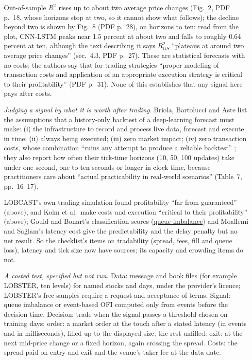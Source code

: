 \begin{qfdefinition}
Out-of-sample $R^2$ rises up to about two average price changes (Fig.~2, PDF p.~18, whose horizons stop at two, so it cannot show what follows); the decline beyond two is shown by Fig.~8 (PDF p.~28), on horizons to ten: read from the plot, CNN-LSTM peaks near 1.5 percent at about two and falls to roughly 0.64 percent at ten, although the text describing it says $R^2_{OS}$ ``plateaus at around two average price changes'' (sec.~4.3, PDF p.~27). These are statistical forecasts with no costs; the authors say that for trading strategies ``proper modeling of transaction costs and application of an appropriate execution strategy is critical to their profitability'' (PDF p.~31). None of this establishes that any signal here pays after costs.

\emph{Judging a signal by what it is worth after trading}. Briola, Bartolucci and Aste list the assumptions that a history-only backtest of a deep-learning forecast must make: (i) the infrastructure to record and process live data, forecast and execute in time; (ii) always being executed; (iii) zero market impact; (iv) zero transaction costs, whose combination ``ruins any attempt to produce a reliable backtest'' \citep[arXiv v4, sec.~7, pp.~22--23]{w2-briola-lob-guide}; they also report how often their tick-time horizons (10, 50, 100 updates) take under one second, one to ten seconds or longer in clock time, because practitioners care about ``actual practicability in real-world scenarios'' (Table~7, pp.~16--17).

LOBCAST's own trading simulation found profitability ``far from guaranteed'' (above), and Kolm et al.\ make costs and execution ``critical to their profitability'' (above); Gould and Bonart's classification scores (\hyperref[def:queue-imbalance]{queue imbalance}) and Moallemi and Sağlam's latency cost give the predictability and the delay penalty but no net result. So the checklist's items on tradability (spread, fees, fill and queue loss), latency and tick size now have sources; its capacity and crowding items do not.

\emph{A costed test, specified but not run.} Data: message and book files (for example LOBSTER, ten levels) for named stocks and days, under the provider's licence; LOBSTER's free samples require a request and acceptance of terms. Signal: queue imbalance or event-based OFI computed only from events before the decision time. Decision: trade when the signal passes a threshold chosen on training days; order: a market order at the touch after a stated latency (in events and in milliseconds), filled up to the displayed size, the rest unfilled; exit: at the next mid-price change or a fixed horizon, again crossing the spread. Costs: the spread paid on entry and exit and the venue's taker fee at the data date.


\end{qfdefinition}
